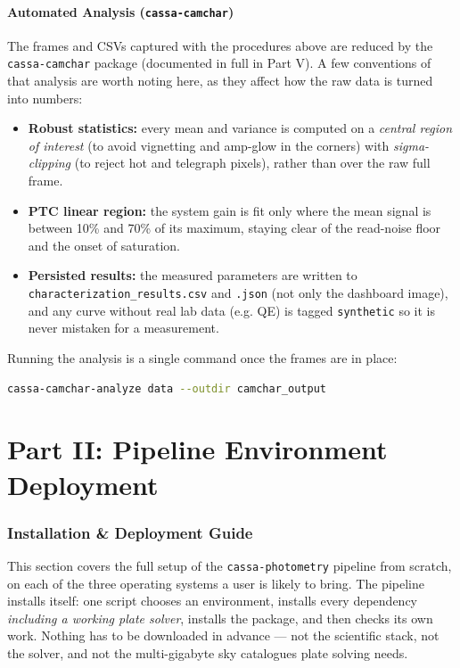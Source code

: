 \documentclass[11pt,a4paper]{article}
\begin{document}
\subsection{Automated Analysis (\texttt{cassa-camchar})}
The frames and CSVs captured with the procedures above are reduced by the \texttt{cassa-camchar} package (documented in full in Part V). A few conventions of that analysis are worth noting here, as they affect how the raw data is turned into numbers:
\begin{itemize}[leftmargin=*]
    \item \textbf{Robust statistics:} every mean and variance is computed on a \emph{central region of interest} (to avoid vignetting and amp-glow in the corners) with \emph{sigma-clipping} (to reject hot and telegraph pixels), rather than over the raw full frame.
    \item \textbf{PTC linear region:} the system gain is fit only where the mean signal is between 10\% and 70\% of its maximum, staying clear of the read-noise floor and the onset of saturation.
    \item \textbf{Persisted results:} the measured parameters are written to \texttt{characterization\_results.csv} and \texttt{.json} (not only the dashboard image), and any curve without real lab data (e.g. QE) is tagged \texttt{synthetic} so it is never mistaken for a measurement.
\end{itemize}
Running the analysis is a single command once the frames are in place:
\begin{lstlisting}[language=bash]
cassa-camchar-analyze data --outdir camchar_output
\end{lstlisting}

\newpage

\part*{Part II: Pipeline Environment Deployment}

\section{Installation \& Deployment Guide}
This section covers the full setup of the \texttt{cassa-photometry} pipeline
from scratch, on each of the three operating systems a user is likely to bring.
The pipeline installs itself: one script chooses an environment, installs every
dependency \emph{including a working plate solver}, installs the package, and
then checks its own work. Nothing has to be downloaded in advance --- not the
scientific stack, not the solver, and not the multi-gigabyte sky catalogues
plate solving needs.
\end{document}
